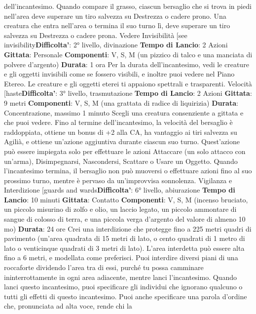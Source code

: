 \begin{multicols}{2}
dell’incantesimo.
Quando compare il grasso, ciascun bersaglio che si
trova in piedi nell’area deve superare un tiro salvezza
su Destrezza o cadere prono. Una creatura che entra
nell’area o termina il suo turno lì, deve superare un tiro
salvezza su Destrezza o cadere prona.
Vedere Invisibilità
[see invisibility\textbf{Difficolta'}:
2° livello, divinazione
\textbf{Tempo di Lancio}: 2 Azioni
\textbf{Gittata}: Personale
\textbf{Componenti}: V, S, M (un pizzico di talco e una
manciata di polvere d’argento)
\textbf{Durata}: 1 ora
Per la durata dell’incantesimo, vedi le creature e gli
oggetti invisibili come se fossero visibili, e inoltre puoi
vedere nel Piano Etereo. Le creature e gli oggetti eterei
ti appaiono spettrali e trasparenti.
Velocità
[haste\textbf{Difficolta'}:
3° livello, trasmutazione
\textbf{Tempo di Lancio}: 2 Azioni
\textbf{Gittata}: 9 metri
\textbf{Componenti}: V, S, M (una grattata di radice di
liquirizia)
\textbf{Durata}: Concentrazione, massimo 1 minuto
Scegli una creatura consenziente a gittata e che puoi
vedere. Fino al termine dell’incantesimo, la velocità del
bersaglio è raddoppiata, ottiene un bonus di +2 alla CA,
ha vantaggio ai tiri salvezza su Agilià, e ottiene
un’azione aggiuntiva durante ciascun suo turno.
Quest’azione può essere impiegata solo per effettuare
le azioni Attaccare (un solo attacco con un’arma),
Disimpegnarsi, Nascondersi, Scattare o Usare un
Oggetto.
Quando l’incantesimo termina, il bersaglio non può
muoversi o effettuare azioni fino al suo prossimo turno,
mentre è pervaso da un’improvvisa sonnolenza.
Vigilanza e Interdizione
[guards and wards\textbf{Difficolta'}:
6° livello, abiurazione
\textbf{Tempo di Lancio}: 10 minuti
\textbf{Gittata}: Contatto
\textbf{Componenti}: V, S, M (incenso bruciato, un piccolo
misurino di zolfo e olio, un laccio legato, un piccolo
ammontare di sangue di colosso di terra, e una piccola
verga d’argento del valore di almeno 10 mo)
\textbf{Durata}: 24 ore
Crei una interdizione che protegge fino a 225 metri
quadri di pavimento (un’area quadrata di 15 metri di
lato, o cento quadrati di 1 metro di lato o venticinque
quadrati di 3 metri di lato). L’area interdetta può essere
alta fino a 6 metri, e modellata come preferisci. Puoi
interdire diversi piani di una roccaforte dividendo l’area
tra di essi, purché tu possa camminare
ininterrottamente in ogni area adiacente, mentre lanci
l’incantesimo.
Quando lanci questo incantesimo, puoi specificare gli
individui che ignorano qualcuno o tutti gli effetti di
questo incantesimo. Puoi anche specificare una parola
d’ordine che, pronunciata ad alta voce, rende chi la

\end{multicols}
